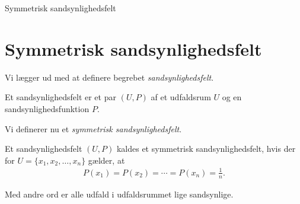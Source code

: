 \begin{center}
\Huge
Symmetrisk sandsynlighedsfelt
\end{center}
\section*{Symmetrisk sandsynlighedsfelt}

Vi lægger ud med at definere begrebet \textit{sandsynlighedsfelt}.

\begin{defn}[Sandsynlighedsfelt]
	Et sandsynlighedsfelt er et par $(U,P)$ af et udfaldsrum $U$ og en sandsynlighedsfunktion $P$.  
\end{defn}

Vi definerer nu et \textit{symmetrisk sandsynlighedsfelt}.
\begin{defn}
	Et sandsynlighedsfelt $(U,P)$ kaldes et symmetrisk sandsynlighedsfelt, hvis der for $U = \{ x_1, x_2,\hdots, x_n\}$ gælder, at 
	\begin{align*}
		P(x_1) = P(x_2) =\cdots = P(x_n) = \frac{1}{n}.
	\end{align*}
\end{defn}
Med andre ord er alle udfald i udfaldsrummet lige sandsynlige. 

